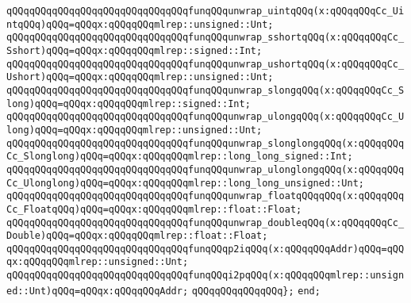 \verb|qQQqqQQqqQQqqQQqqQQqqQQqqQQqqQQqfunqQQqunwrap_uintqQQq(x:qQQqqQQqCc_UintqQQq)qQQq=qQQqx:qQQqqQQqmlrep::unsigned::Unt;|\newline
\newline
\verb|qQQqqQQqqQQqqQQqqQQqqQQqqQQqqQQqfunqQQqunwrap_sshortqQQq(x:qQQqqQQqCc_Sshort)qQQq=qQQqx:qQQqqQQqmlrep::signed::Int;|\newline
\verb|qQQqqQQqqQQqqQQqqQQqqQQqqQQqqQQqfunqQQqunwrap_ushortqQQq(x:qQQqqQQqCc_Ushort)qQQq=qQQqx:qQQqqQQqmlrep::unsigned::Unt;|\newline
\newline
\verb|qQQqqQQqqQQqqQQqqQQqqQQqqQQqqQQqfunqQQqunwrap_slongqQQq(x:qQQqqQQqCc_Slong)qQQq=qQQqx:qQQqqQQqmlrep::signed::Int;|\newline
\verb|qQQqqQQqqQQqqQQqqQQqqQQqqQQqqQQqfunqQQqunwrap_ulongqQQq(x:qQQqqQQqCc_Ulong)qQQq=qQQqx:qQQqqQQqmlrep::unsigned::Unt;|\newline
\newline
\verb|qQQqqQQqqQQqqQQqqQQqqQQqqQQqqQQqfunqQQqunwrap_slonglongqQQq(x:qQQqqQQqCc_Slonglong)qQQq=qQQqx:qQQqqQQqmlrep::long_long_signed::Int;|\newline
\verb|qQQqqQQqqQQqqQQqqQQqqQQqqQQqqQQqfunqQQqunwrap_ulonglongqQQq(x:qQQqqQQqCc_Ulonglong)qQQq=qQQqx:qQQqqQQqmlrep::long_long_unsigned::Unt;|\newline
\newline
\verb|qQQqqQQqqQQqqQQqqQQqqQQqqQQqqQQqfunqQQqunwrap_floatqQQqqQQq(x:qQQqqQQqCc_FloatqQQq)qQQq=qQQqx:qQQqqQQqmlrep::float::Float;|\newline
\verb|qQQqqQQqqQQqqQQqqQQqqQQqqQQqqQQqfunqQQqunwrap_doubleqQQq(x:qQQqqQQqCc_Double)qQQq=qQQqx:qQQqqQQqmlrep::float::Float;|\newline
\newline
\verb|qQQqqQQqqQQqqQQqqQQqqQQqqQQqqQQqfunqQQqp2iqQQq(x:qQQqqQQqAddr)qQQq=qQQqx:qQQqqQQqmlrep::unsigned::Unt;|\newline
\verb|qQQqqQQqqQQqqQQqqQQqqQQqqQQqqQQqfunqQQqi2pqQQq(x:qQQqqQQqmlrep::unsigned::Unt)qQQq=qQQqx:qQQqqQQqAddr;|\newline
\verb|qQQqqQQqqQQqqQQq};|\newline
\verb|end;|\newline
\newline
\newline

